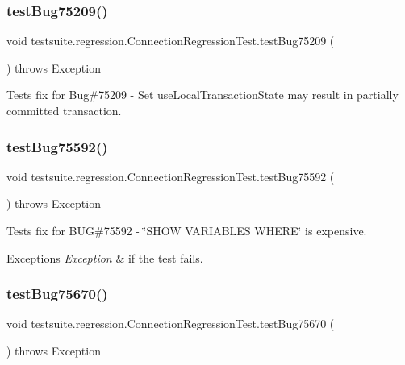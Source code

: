 \subsubsection{\texorpdfstring{test\+Bug75209()}{testBug75209()}}
{\footnotesize\ttfamily void testsuite.\+regression.\+Connection\+Regression\+Test.\+test\+Bug75209 (\begin{DoxyParamCaption}{ }\end{DoxyParamCaption}) throws Exception}

Tests fix for Bug\#75209 -\/ Set use\+Local\+Transaction\+State may result in partially committed transaction. \mbox{\label{classtestsuite_1_1regression_1_1_connection_regression_test_a665407a24ed690a64058e8f86c4d6063}} 
\subsubsection{\texorpdfstring{test\+Bug75592()}{testBug75592()}}
{\footnotesize\ttfamily void testsuite.\+regression.\+Connection\+Regression\+Test.\+test\+Bug75592 (\begin{DoxyParamCaption}{ }\end{DoxyParamCaption}) throws Exception}

Tests fix for B\+UG\#75592 -\/ \char`\"{}\+S\+H\+O\+W V\+A\+R\+I\+A\+B\+L\+E\+S W\+H\+E\+R\+E\char`\"{} is expensive.


\begin{DoxyExceptions}{Exceptions}
{\em Exception} & if the test fails. \\
\hline
\end{DoxyExceptions}
\mbox{\label{classtestsuite_1_1regression_1_1_connection_regression_test_ae51a7e49df56ea469720a9d165fc124a}} 
\subsubsection{\texorpdfstring{test\+Bug75670()}{testBug75670()}}
{\footnotesize\ttfamily void testsuite.\+regression.\+Connection\+Regression\+Test.\+test\+Bug75670 (\begin{DoxyParamCaption}{ }\end{DoxyParamCaption}) throws Exception}

